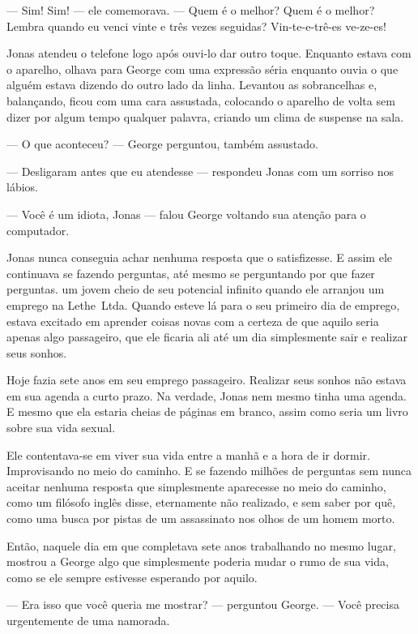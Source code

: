 --- Sim! Sim! --- ele comemorava. --- Quem é o melhor? Quem é o melhor? Lembra quando eu venci vinte e três vezes seguidas? Vin-te-e-trê-es ve-ze-es!

Jonas atendeu o telefone logo após ouvi-lo dar outro toque. Enquanto estava com o aparelho, olhava para George com uma expressão séria enquanto ouvia o que alguém estava dizendo do outro lado da linha. Levantou as sobrancelhas e, balançando, ficou com uma cara assustada, colocando o aparelho de volta sem dizer por algum tempo qualquer palavra, criando um clima de suspense na sala.

--- O que aconteceu? --- George perguntou, também assustado.

--- Desligaram antes que eu atendesse --- respondeu Jonas com um sorriso nos lábios.

--- Você é um idiota, Jonas --- falou George voltando sua atenção para o computador.

Jonas nunca conseguia achar nenhuma resposta que o satisfizesse. E assim ele continuava se fazendo perguntas, até mesmo se perguntando por que fazer perguntas.  um jovem cheio de seu potencial infinito quando ele arranjou um emprego na Lethe~Ltda. Quando esteve lá para o seu primeiro dia de emprego, estava excitado em aprender coisas novas com a certeza de que aquilo seria apenas algo passageiro, que ele ficaria ali até um dia simplesmente sair e realizar seus sonhos.

Hoje fazia sete anos em seu emprego passageiro. Realizar seus sonhos não estava em sua agenda a curto prazo. Na verdade, Jonas nem mesmo tinha uma agenda. E mesmo que  ela estaria cheias de páginas em branco, assim como seria um livro sobre sua vida sexual.

Ele contentava-se em viver sua vida entre a manhã e a hora de ir dormir. Improvisando no meio do caminho. E se fazendo milhões de perguntas sem nunca aceitar nenhuma resposta que simplesmente aparecesse no meio do caminho, como um filósofo inglês disse, eternamente não realizado, e sem saber por quê, como uma busca por pistas de um assassinato nos olhos de um homem morto.

Então, naquele dia em que completava sete anos trabalhando no mesmo lugar, mostrou a George algo que simplesmente poderia mudar o rumo de sua vida, como se ele sempre estivesse esperando por aquilo.

--- Era isso que você queria me mostrar? --- perguntou George. --- Você precisa urgentemente de uma namorada.

